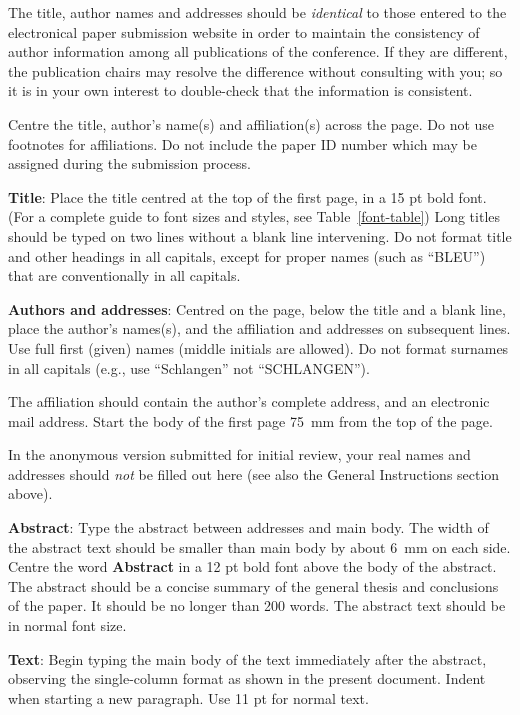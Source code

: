 \documentclass{clarin}
\begin{document}
The title, author names and addresses should be \emph{identical}
to those entered to the electronical paper submission website in order
to maintain the consistency of author information among all
publications of the conference. If they are different, the publication
chairs may resolve the difference without consulting with you; so it
is in your own interest to double-check that the information is
consistent.

Centre the title, author's name(s) and affiliation(s) across
the page.
Do not use footnotes for affiliations. Do not include the
paper ID number which may be assigned during the submission process.

{\bf Title}: Place the title centred at the top of the first page, in
a 15 pt bold font. (For a complete guide to font sizes and styles,
see Table~\ref{font-table}) Long titles should be typed on two lines
without a blank line intervening.
Do not format title and other headings in all
capitals, except for proper names (such as ``BLEU'') that are
conventionally in all capitals.

{\bf Authors and addresses}: Centred on the page,
below the title and a blank line, place the author's names(s),
and the affiliation and addresses on subsequent lines.
Use full first (given) names (middle initials are allowed). Do
not format surnames in all capitals (e.g., use ``Schlangen'' not
``SCHLANGEN'').

The affiliation should contain the
author's complete address, and an electronic mail
address. Start the body of the first page 75~mm from the top of the
page.

In the anonymous version submitted for initial review, your real names and addresses
should \emph{not} be filled out here (see also the General Instructions section above).

{\bf Abstract}: Type the abstract between addresses and main body.
The width of the abstract text should be
smaller than main body by about 6~mm on each side.
Centre the word {\bf Abstract} in a 12 pt bold
font above the body of the abstract. The abstract should be a concise
summary of the general thesis and conclusions of the paper. It should
be no longer than 200 words. The abstract text should be in normal font size.

{\bf Text}: Begin typing the main body of the text immediately after
the abstract, observing the single-column format as shown in
the present document. Indent when starting a new paragraph. Use 11 pt for normal text.
\end{document}

